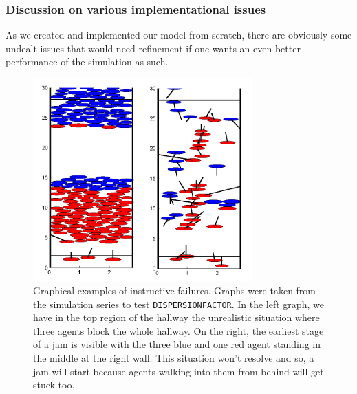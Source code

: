 \subsubsection{Discussion on various implementational issues}
As we created and implemented our model from scratch, there are obviously some undealt issues that would need refinement if one wants an even better performance of the simulation as such.\\

\begin{figure}[h!]
	\centering
		\includegraphics[width=0.75\textwidth]{pictures/exFails}
	\caption{Graphical examples of instructive failures. Graphs were taken from the simulation series to test \texttt{DISPERSIONFACTOR}. In the left graph, we have in the top region of the hallway the unrealistic situation where three agents block the whole hallway. On the right, the earliest stage of a jam is visible with the three blue and one red agent standing in the middle at the right wall. This situation won't resolve and so, a jam will start because agents walking into them from behind will get stuck too.}
	\label{fig:exFails}
\end{figure}

